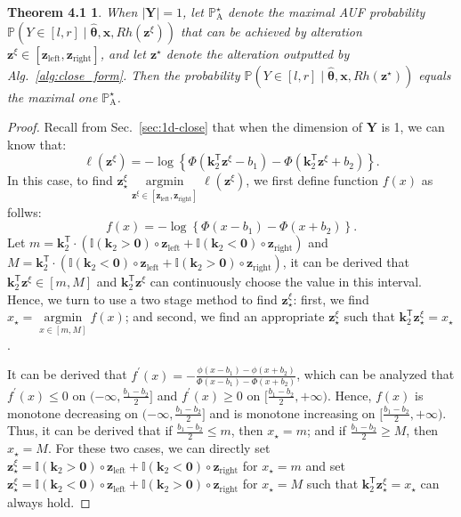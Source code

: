 \documentclass{article}
\theoremstyle{plain}
\newtheorem*{theorem41}{Theorem 4.1}
\theoremstyle{definition}
\def \x {\mathbf{x}}
\def \Y{\mathbf{Y}}
\def \Sec {Sec.}
\def \x {\mathbf{x}}
\def \Y {\mathbf{Y}}
\def \k {\mathbf{k}}
\def \z {\mathbf{z}}
\begin{document}
\begin{theorem41}
    When \(|\Y|=1\), let \(\mathbb{P}_{\operatorname*{A}}^\star\) denote the maximal AUF probability \(\mathbb{P}(Y \in [l, r]\mid \hat{\bm{\theta}}, \x, Rh(\z^\xi))\) that can be achieved by alteration \(\z^\xi\in\left[\z_{\operatorname*{left}}, \z_{\operatorname*{right}}\right]\), and let \(\z^\star\) denote the alteration outputted by Alg.~\ref{alg:close_form}. Then the probability \(\mathbb{P}(Y \in [l, r]\mid \hat{\bm{\theta}}, \x, Rh(\z^\star))\) equals the maximal one \(\mathbb{P}_{\operatorname*{A}}^\star\).
\end{theorem41}


\begin{proof}
  \label{proof:close}
  Recall from \Sec~\ref{sec:1d-close} that when the dimension of $\Y$ is 1, we can know that:
  \[
    \ell(\z^\xi)=-\log\left\{ \Phi\left(\k_2^\mathsf{T} \z^\xi - b_1\right) - \Phi\left(\k_2^\mathsf{T} \z^\xi + b_2\right) \right\}.
  \]
  In this case, to find $\z^\xi_\star\mathop{\arg\min}\limits_{\z^\xi\in[\z_{\operatorname{left}}, \z_{\operatorname{right}}]}\ell(\z^\xi)$, we first define function $f(x)$ as follws:
  \[
    f(x)=-\log\left\{ \Phi\left(x - b_1\right) - \Phi\left(x + b_2\right) \right\}.
  \]
  Let $m=\k_2^\mathsf{T}\cdot\left(\mathbb{I}(\k_2>\bm{0})\circ\z_{\operatorname{left}}+ \mathbb{I}(\k_2<\bm{0})\circ\z_{\operatorname{right}}\right)$ and $M=\k_2^\mathsf{T}\cdot\left(\mathbb{I}(\k_2<\bm{0})\circ\z_{\operatorname{left}} + \mathbb{I}(\k_2>\bm{0})\circ\z_{\operatorname{right}}\right)$, it can be derived that $\k_2^\mathsf{T} \z^\xi \in \left[m, M\right]$ and $\k_2^\mathsf{T} \z^\xi$ can continuously choose the value in this interval. Hence, we turn to use a two stage method to find $\z^\xi_\star$: first, we find $x_\star = \mathop{\arg\min}\limits_{x\in[m, M]} f(x)$; and second, we find an appropriate $\z^\xi_\star$ such that $\k_2^\mathsf{T} \z^\xi_\star = x_\star$.

  It can be derived that $f^\prime(x) = -\frac{\phi\left(x - b_1\right) - \phi\left(x + b_2\right)}{\Phi\left(x - b_1\right) - \Phi\left(x + b_2\right)}$, which can be analyzed that $f^\prime(x) \leq 0$ on $(-\infty, \frac{b_1-b_2}{2}]$ and $f^\prime(x) \geq 0$ on $[\frac{b_1-b_2}{2}, +\infty)$. Hence, $f(x)$ is monotone decreasing on $(-\infty, \frac{b_1-b_2}{2}]$ and is monotone increasing on $[\frac{b_1-b_2}{2}, +\infty)$. Thus, it can be derived that if $\frac{b_1-b_2}{2} \leq m$, then $x_\star = m$; and if $\frac{b_1-b_2}{2} \geq M$, then $x_\star = M$. For these two cases, we can directly set $\z^\xi_\star = \mathbb{I}(\k_2>\bm{0})\circ\z_{\operatorname{left}}+ \mathbb{I}(\k_2<\bm{0})\circ\z_{\operatorname{right}}$ for $x_\star = m$ and set $\z^\xi_\star = \mathbb{I}(\k_2<\bm{0})\circ\z_{\operatorname{left}} + \mathbb{I}(\k_2>\bm{0})\circ\z_{\operatorname{right}}$ for $x_\star = M$ such that $\k_2^\mathsf{T} \z^\xi_\star = x_\star$ can always hold.


\end{proof}
\end{document}
